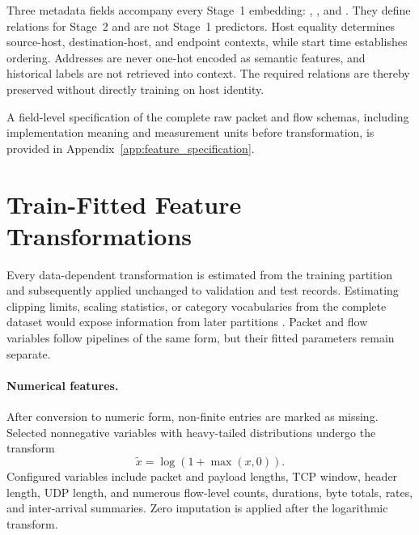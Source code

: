 \documentclass[11pt,fleqn]{report}
\begin{document}
Three metadata fields accompany every Stage~1 embedding: , , and . They define relations for Stage~2 and are not Stage~1 predictors. Host equality determines source-host, destination-host, and endpoint contexts, while start time establishes ordering. Addresses are never one-hot encoded as semantic features, and historical labels are not retrieved into context. The required relations are thereby preserved without directly training on host identity.

A field-level specification of the complete raw packet and flow schemas, including implementation meaning and measurement units before transformation, is provided in Appendix~\ref{app:feature_specification}.

\section{Train-Fitted Feature Transformations}
\label{subsec:feature_transformations}

Every data-dependent transformation is estimated from the training partition and subsequently applied unchanged to validation and test records. Estimating clipping limits, scaling statistics, or category vocabularies from the complete dataset would expose information from later partitions \cite{Arp2022DosDonts}. Packet and flow variables follow pipelines of the same form, but their fitted parameters remain separate.

\paragraph{Numerical features.}
After conversion to numeric form, non-finite entries are marked as missing. Selected nonnegative variables with heavy-tailed distributions undergo the transform
\begin{equation}
    \widetilde{x}=\log(1+\max(x,0)).
    \label{eq:log1p_preprocessing}
\end{equation}
Configured variables include packet and payload lengths, TCP window, header length, UDP length, and numerous flow-level counts, durations, byte totals, rates, and inter-arrival summaries. Zero imputation is applied after the logarithmic transform.
\end{document}
